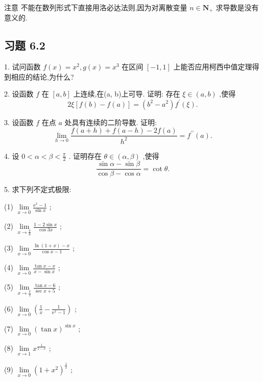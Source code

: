注意 不能在数列形式下直接用洛必达法则,因为对离散变量 \(n \in  {\mathbf{N}}_{ + }\) 求导数是没有意义的.

\subsection{习题 6.2}

1. 试问函数 \(f\left( x\right)  = {x}^{2},g\left( x\right)  = {x}^{3}\) 在区间 \(\left\lbrack  {-1,1}\right\rbrack\) 上能否应用柯西中值定理得到相应的结论,为什么?

2. 设函数 \(f\) 在 \(\left\lbrack  {a,b}\right\rbrack\) 上连续,在(a, b)上可导. 证明: 存在 \(\xi  \in  \left( {a,b}\right)\) ,使得
\[
{2\xi }\left\lbrack  {f\left( b\right)  - f\left( a\right) }\right\rbrack   = \left( {{b}^{2} - {a}^{2}}\right) {f}^{\prime }\left( \xi \right) .
\]

3. 设函数 \(f\) 在点 \(a\) 处具有连续的二阶导数. 证明:
\[
\mathop{\lim }\limits_{{h \rightarrow  0}}\frac{f\left( {a + h}\right)  + f\left( {a - h}\right)  - {2f}\left( a\right) }{{h}^{2}} = {f}^{\prime \prime }\left( a\right) .
\]

4. 设 \(0 < \alpha  < \beta  < \frac{\pi }{2}\) . 证明存在 \(\theta  \in  \left( {\alpha ,\beta }\right)\) ,使得
\[
\frac{\sin \alpha  - \sin \beta }{\cos \beta  - \cos \alpha } = \cot \theta .
\]

5. 求下列不定式极限:

(1) \(\mathop{\lim }\limits_{{x \rightarrow  0}}\frac{{\mathrm{e}}^{x} - 1}{\sin x}\) ;

(2) \(\mathop{\lim }\limits_{{x \rightarrow  \frac{\pi }{6}}}\frac{1 - 2\sin x}{\cos {3x}}\) ;

(3) \(\mathop{\lim }\limits_{{x \rightarrow  0}}\frac{\ln \left( {1 + x}\right)  - x}{\cos x - 1}\) ;

(4) \(\mathop{\lim }\limits_{{x \rightarrow  0}}\frac{\tan x - x}{x - \sin x}\) ;

(5) \(\mathop{\lim }\limits_{{x \rightarrow  \frac{\pi }{2}}}\frac{\tan x - 6}{\sec x + 5}\) ;

(6) \(\mathop{\lim }\limits_{{x \rightarrow  0}}\left( {\frac{1}{x} - \frac{1}{{\mathrm{e}}^{x} - 1}}\right)\) ;

(7) \(\mathop{\lim }\limits_{{x \rightarrow  0}}{\left( \tan x\right) }^{\sin x}\) ;

(8) \(\mathop{\lim }\limits_{{x \rightarrow  1}}{x}^{\frac{1}{1 - x}}\) ;

(9) \(\mathop{\lim }\limits_{{x \rightarrow  0}}{\left( 1 + {x}^{2}\right) }^{\frac{1}{x}}\) ;

